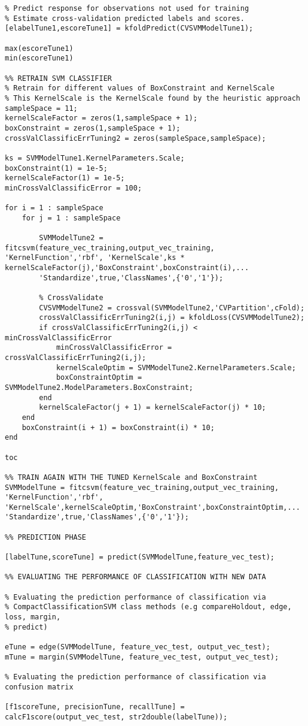 \begin{lstlisting}
% Predict response for observations not used for training
% Estimate cross-validation predicted labels and scores.
[elabelTune1,escoreTune1] = kfoldPredict(CVSVMModelTune1);

max(escoreTune1)
min(escoreTune1)

%% RETRAIN SVM CLASSIFIER
% Retrain for different values of BoxConstraint and KernelScale
% This KernelScale is the KernelScale found by the heuristic approach
sampleSpace = 11;
kernelScaleFactor = zeros(1,sampleSpace + 1);
boxConstraint = zeros(1,sampleSpace + 1);
crossValClassificErrTuning2 = zeros(sampleSpace,sampleSpace);

ks = SVMModelTune1.KernelParameters.Scale;
boxConstraint(1) = 1e-5;
kernelScaleFactor(1) = 1e-5;
minCrossValClassificError = 100;

for i = 1 : sampleSpace
    for j = 1 : sampleSpace
        
        SVMModelTune2 = fitcsvm(feature_vec_training,output_vec_training, 'KernelFunction','rbf', 'KernelScale',ks * kernelScaleFactor(j),'BoxConstraint',boxConstraint(i),...
        'Standardize',true,'ClassNames',{'0','1'});
        
        % CrossValidate
        CVSVMModelTune2 = crossval(SVMModelTune2,'CVPartition',cFold);
        crossValClassificErrTuning2(i,j) = kfoldLoss(CVSVMModelTune2);
        if crossValClassificErrTuning2(i,j) < minCrossValClassificError
            minCrossValClassificError = crossValClassificErrTuning2(i,j);
            kernelScaleOptim = SVMModelTune2.KernelParameters.Scale;
            boxConstraintOptim = SVMModelTune2.ModelParameters.BoxConstraint;
        end
        kernelScaleFactor(j + 1) = kernelScaleFactor(j) * 10;
    end
    boxConstraint(i + 1) = boxConstraint(i) * 10;
end

toc

%% TRAIN AGAIN WITH THE TUNED KernelScale and BoxConstraint
SVMModelTune = fitcsvm(feature_vec_training,output_vec_training, 'KernelFunction','rbf', 'KernelScale',kernelScaleOptim,'BoxConstraint',boxConstraintOptim,...
'Standardize',true,'ClassNames',{'0','1'});

%% PREDICTION PHASE

[labelTune,scoreTune] = predict(SVMModelTune,feature_vec_test);

%% EVALUATING THE PERFORMANCE OF CLASSIFICATION WITH NEW DATA

% Evaluating the prediction performance of classification via
% CompactClassificationSVM class methods (e.g compareHoldout, edge, loss, margin, 
% predict)

eTune = edge(SVMModelTune, feature_vec_test, output_vec_test);
mTune = margin(SVMModelTune, feature_vec_test, output_vec_test);

% Evaluating the prediction performance of classification via confusion matrix

[f1scoreTune, precisionTune, recallTune] = calcF1score(output_vec_test, str2double(labelTune));
 \end{lstlisting}
 
